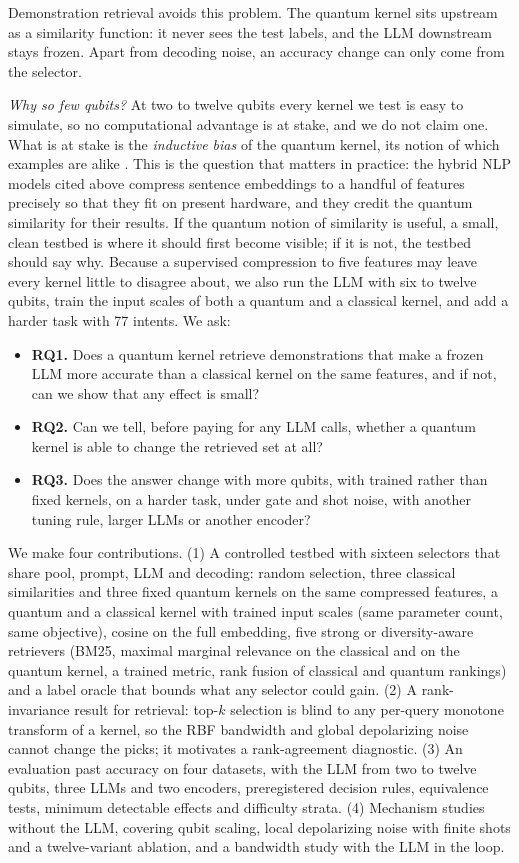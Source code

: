 Demonstration retrieval avoids this problem. The quantum kernel sits upstream as a similarity function:
it never sees the test labels, and the LLM downstream stays frozen. Apart from decoding noise, an
accuracy change can only come from the selector.

\emph{Why so few qubits?} At two to twelve qubits every kernel we test is easy to simulate, so no
computational advantage is at stake, and we do not claim one. What is at stake is the \emph{inductive
bias} of the quantum kernel, its notion of which examples are alike \cite{kubler2021inductive}. This is
the question that matters in practice: the hybrid NLP models cited above compress sentence embeddings to
a handful of features precisely so that they fit on present hardware, and they credit the quantum
similarity for their results. If the quantum notion of similarity is useful, a small, clean testbed is
where it should first become visible; if it is not, the testbed should say why. Because a supervised
compression to five features may leave every kernel little to disagree about, we also run the LLM with
six to twelve qubits, train the input scales of both a quantum and a classical kernel, and add a harder
task with 77 intents. We ask:

\begin{itemize}
\item \textbf{RQ1.} Does a quantum kernel retrieve demonstrations that make a frozen LLM more accurate
than a classical kernel on the same features, and if not, can we show that any effect is small?
\item \textbf{RQ2.} Can we tell, before paying for any LLM calls, whether a quantum kernel is able to
change the retrieved set at all?
\item \textbf{RQ3.} Does the answer change with more qubits, with trained rather than fixed kernels, on a
harder task, under gate and shot noise, with another tuning rule, larger LLMs or another encoder?
\end{itemize}

We make four contributions. (1) A controlled testbed with sixteen selectors that share pool, prompt,
LLM and decoding: random selection, three classical similarities and three fixed quantum kernels on the
same compressed features, a quantum and a classical kernel with trained input scales (same parameter
count, same objective), cosine on the full embedding, five strong or diversity-aware retrievers (BM25,
maximal marginal relevance on the classical and on the quantum kernel, a trained metric, rank fusion of
classical and quantum rankings) and a label oracle that bounds what any selector could gain. (2) A rank-invariance result for retrieval: top-$k$
selection is blind to any per-query monotone transform of a kernel, so the RBF bandwidth and global
depolarizing noise cannot change the picks; it motivates a rank-agreement diagnostic. (3) An evaluation
past accuracy on four datasets, with the LLM from two to twelve qubits, three LLMs and two encoders,
preregistered decision rules, equivalence tests, minimum detectable effects and difficulty strata.
(4) Mechanism studies without the LLM, covering qubit scaling, local depolarizing noise with finite shots
and a twelve-variant ablation, and a bandwidth study with the LLM in the loop.

